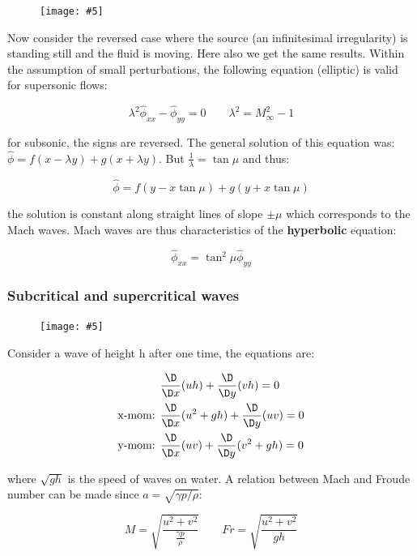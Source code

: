 \documentclass[british,french,11pt, a4paper, openany]{article}
\newcommand{\wrapfig}[6]{%
	\begin{figure}%
		\vspace{-5mm}%
		\texttt{[image: \#5]}%
		\captionof{figure}{}%
		\label{#6}%
	\end{figure}%
}
\begin{document}
\wrapfig{7}{l}{6}{0.25}{ch8/5}{ch8/5}
Now consider the reversed case where the source (an infinitesimal irregularity) is standing still and the fluid is moving. Here also we get the same results. Within the assumption of small perturbations, the following equation (elliptic) is valid for supersonic flows: 

\begin{equation}
\lambda ^2 \hat{\phi} _{xx} - \hat{\phi}_{yy} = 0 \qquad \lambda ^2 = M_\infty ^2 -1
\end{equation}

for subsonic, the signs are reversed. The general solution of this equation was: $\hat{\phi} = f(x-\lambda y) + g(x+\lambda y)$. But $\frac{1}{\lambda} = \tan \mu$ and thus: 

\begin{equation}
\hat{\phi} = f(y - x\tan \mu) + g(y + x \tan \mu)
\end{equation}

the solution is constant along straight lines of slope $\pm \mu$ which corresponds to the Mach waves. Mach waves are thus characteristics of the \textbf{hyperbolic} equation: 

\begin{equation}
\hat{\phi} _{xx} = \tan^2 \mu \hat{\phi} _{yy} 
\end{equation}

\subsubsection{Subcritical and supercritical waves}
\wrapfig{5}{l}{3.5}{0.05}{ch8/8}{ch8/8}
Consider a wave of height h after one time, the equations are: 

\begin{equation}
\begin{aligned}
&\frac{\D }{\D x} (uh) + \frac{\D}{\D y} (vh) = 0\\
\mbox{x-mom: } &\frac{\D}{\D x } (u^2 + gh) + \frac{\D}{\D y} (uv) = 0\\
\mbox{y-mom: } &\frac{\D}{\D x } (uv) + \frac{\D}{\D y} (v^2 + gh) = 0
\end{aligned}
\end{equation}

where $\sqrt{gh}$ is the speed of waves on water. A relation between Mach and Froude number can be made since $a = \sqrt{\gamma p /\rho}$: 

\begin{equation}
M = \sqrt{\frac{u^2 + v^2}{\frac{\gamma p}{\rho}}} \qquad Fr = \sqrt{\frac{u^2 + v^2}{gh}}
\end{equation}
\end{document}
